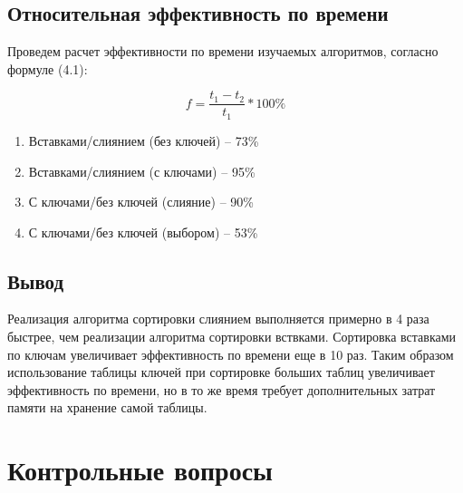 
\section{Относительная эффективность по времени}

Проведем расчет эффективности по времени изучаемых алгоритмов, согласно формуле (4.1):

\begin{equation}
	f = \frac{t_1 - t_2}{t_1} * 100\%
\end{equation}

\begin{enumerate}
	\item Вставками/слиянием (без ключей) -- 73\%
	\item Вставками/слиянием (с ключами) -- 95\%
	\item С ключами/без ключей (слияние) -- 90\%
	\item С ключами/без ключей (выбором) -- 53\%
\end{enumerate}

\section{Вывод}

Реализация алгоритма сортировки слиянием выполняется примерно в 4 раза быстрее, чем реализации алгоритма сортировки вствками. Сортировка вставками по ключам увеличивает эффективность по времени еще в 10 раз. Таким образом использование таблицы ключей при сортировке больших таблиц увеличивает эффективность по времени, но в то же время требует дополнительных затрат памяти на хранение самой таблицы.

\chapter{Контрольные вопросы}

